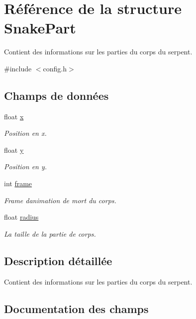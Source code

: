 \hypertarget{struct_snake_part}{}\section{Référence de la structure Snake\+Part}
\label{struct_snake_part}


Contient des informations sur les parties du corps du serpent.  




{\ttfamily \#include $<$config.\+h$>$}

\subsection*{Champs de données}
\begin{DoxyCompactItemize}
\item 
float \hyperlink{struct_snake_part_aa89592002258552d0bfa2cb08f993c30}{x}
\begin{DoxyCompactList}\small\item\em Position en x. \end{DoxyCompactList}\item 
float \hyperlink{struct_snake_part_a2fbe23ceaa2d9c8bce8038e1b3fce35d}{y}
\begin{DoxyCompactList}\small\item\em Position en y. \end{DoxyCompactList}\item 
int \hyperlink{struct_snake_part_a9900b204d0fc48c0ff81a340d809e66a}{frame}
\begin{DoxyCompactList}\small\item\em Frame d\textquotesingle{}animation de mort du corps. \end{DoxyCompactList}\item 
float \hyperlink{struct_snake_part_a21c89b331903355847ec4f6d1e7230ba}{radius}
\begin{DoxyCompactList}\small\item\em La taille de la partie de corps. \end{DoxyCompactList}\end{DoxyCompactItemize}


\subsection{Description détaillée}
Contient des informations sur les parties du corps du serpent. 

\subsection{Documentation des champs}
\mbox{\label{struct_snake_part_a9900b204d0fc48c0ff81a340d809e66a}} 

